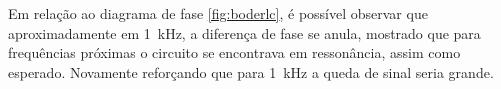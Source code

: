   Em relação ao diagrama de fase \ref{fig:boderlc}, é possível observar que aproximadamente em \SI{1}{\kilo\hertz}, a diferença de fase se anula, mostrado que para frequências próximas o circuito se encontrava em ressonância, assim como esperado. Novamente reforçando que para \SI{1}{\kilo\hertz} a queda de sinal seria grande.